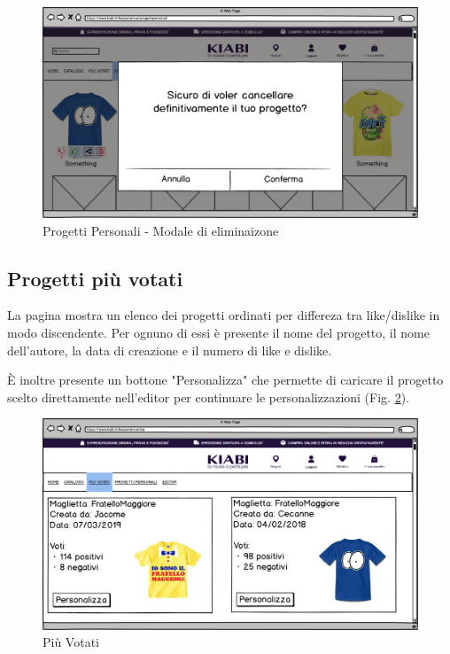 \documentclass[12pt,italian,]{report}
\begin{document}
\begin{figure}[h]
\centering
\includegraphics{../../balsamiq/balsamiq_finale/ProgettiPersonalieliminazione.png}
\caption{Progetti Personali - Modale di eliminaizone}
\label{progetti_personali_delete}
\end{figure}
\clearpage


\newpage
\subsection{Progetti più votati} 

La pagina mostra un elenco dei progetti ordinati per differeza tra like/dislike in modo discendente. Per ognuno di essi è presente il nome del progetto, il nome dell'autore, la data di creazione e il numero di like e dislike.

È inoltre presente un bottone "Personalizza" che permette di caricare il progetto scelto direttamente nell'editor per continuare le personalizzazioni (Fig. \ref{piu_votati}).


\begin{figure}[h]
\centering
\includegraphics{../../balsamiq/balsamiq_finale/MostRated.png}
\caption{Più Votati}
\label{piu_votati}
\end{figure}
\end{document}
